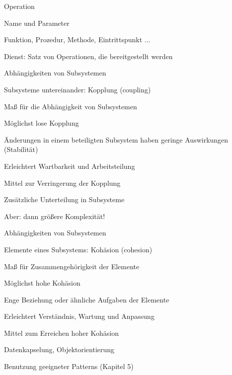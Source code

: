 \documentclass[a4paper]{article}
\begin{document}
\begin{multicols}{3}
  Operation
  \begin{itemize*}
    \item Name und Parameter
    \item Funktion, Prozedur, Methode, Eintrittspunkt ...
  \end{itemize*}

  Dienst: Satz von Operationen, die bereitgestellt werden

  Abhängigkeiten von Subsystemen
  \begin{itemize*}
    \item Subsysteme untereinander: Kopplung (coupling)
    \item Maß für die Abhängigkeit von Subsystemen
  \end{itemize*}

  Möglichst lose Kopplung
  \begin{itemize*}
    \item Änderungen in einem beteiligten Subsystem haben geringe Auswirkungen (Stabilität)
    \item Erleichtert Wartbarkeit und Arbeitsteilung
  \end{itemize*}

  Mittel zur Verringerung der Kopplung
  \begin{itemize*}
    \item Zusätzliche Unterteilung in Subsysteme
    \item Aber: dann größere Komplexität!
  \end{itemize*}

  Abhängigkeiten von Subsystemen

  \begin{itemize*}
    \item Elemente eines Subsystems: Kohäsion (cohesion)
    \item Maß für Zusammengehörigkeit der Elemente
    \item Möglichst hohe Kohäsion
          \begin{itemize*}
            \item Enge Beziehung oder ähnliche Aufgaben der Elemente
            \item Erleichtert Verständnis, Wartung und Anpassung
          \end{itemize*}
    \item Mittel zum Erreichen hoher Kohäsion
          \begin{itemize*}
            \item Datenkapselung, Objektorientierung
            \item Benutzung geeigneter Patterns (Kapitel 5)
          \end{itemize*}
  \end{itemize*}


\end{multicols}
\end{document}
